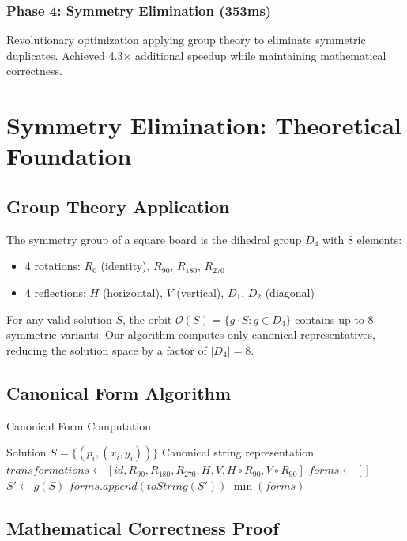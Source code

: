 \documentclass[12pt,a4paper]{article}
\theoremstyle{definition}
\begin{document}
\subsubsection{Phase 4: Symmetry Elimination (353ms)}
Revolutionary optimization applying group theory to eliminate symmetric duplicates. Achieved 4.3× additional speedup while maintaining mathematical correctness.

\section{Symmetry Elimination: Theoretical Foundation}

\subsection{Group Theory Application}

The symmetry group of a square board is the dihedral group $D_4$ with 8 elements:
\begin{itemize}
\item 4 rotations: $R_0$ (identity), $R_{90}$, $R_{180}$, $R_{270}$
\item 4 reflections: $H$ (horizontal), $V$ (vertical), $D_1$, $D_2$ (diagonal)
\end{itemize}

For any valid solution $S$, the orbit $\mathcal{O}(S) = \{g \cdot S : g \in D_4\}$ contains up to 8 symmetric variants. Our algorithm computes only canonical representatives, reducing the solution space by a factor of $|D_4| = 8$.

\subsection{Canonical Form Algorithm}

\begin{algorithm}
\caption{Canonical Form Computation}
\begin{algorithmic}[1]
\REQUIRE Solution $S = \{(p_i, (x_i, y_i))\}$
\ENSURE Canonical string representation
\STATE $transformations \leftarrow [id, R_{90}, R_{180}, R_{270}, H, V, H \circ R_{90}, V \circ R_{90}]$
\STATE $forms \leftarrow []$
    \STATE $S' \leftarrow g(S)$
    \STATE $forms.append(toString(S'))$
\ENDFOR
\RETURN $\min(forms)$ 
\end{algorithmic}
\end{algorithm}

\subsection{Mathematical Correctness Proof}
\end{document}
